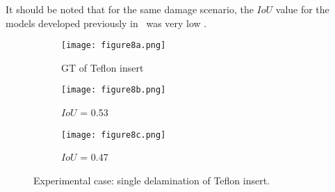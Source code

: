 \DIFaddend It should be noted that for the same damage scenario, the \(IoU\) value for the models developed previously in~\cite{Ijjeh2021} was very low \DIFdelbegin {}\DIFdelend \DIFaddbegin {}\DIFaddend .


\begin{figure} [!h]
	\centering
	\begin{subfigure}[b]{0.32\textwidth}
		\centering
		\DIFdelbeginFL %
\DIFdelendFL \DIFaddbeginFL \texttt{[image: figure8a.png]}
		\DIFaddendFL \caption{GT of Teflon insert}
		\label{fig:exp_CFRP_teflon_3o_GT}
	\end{subfigure}
	\hfill
	\begin{subfigure}[b]{0.32\textwidth}
		\centering
		\DIFdelbeginFL %
\DIFdelendFL \DIFaddbeginFL \texttt{[image: figure8b.png]}
		\DIFaddendFL \caption{\(IoU\) = 0.53 } 
		\label{fig:model_1_CFRP_teflon_3o}
	\end{subfigure}
	\hfill
	\begin{subfigure}[b]{0.32\textwidth}
		\centering
		\DIFdelbeginFL %
\DIFdelendFL \DIFaddbeginFL \texttt{[image: figure8c.png]}
		\DIFaddendFL \caption{\(IoU\) = 0.47}
		\label{fig:model_2_CFRP_teflon_3o}
	\end{subfigure}
	\caption{Experimental case: single delamination of Teflon insert.}
	\label{fig:exp_Teflon_insert}
\end{figure} 

